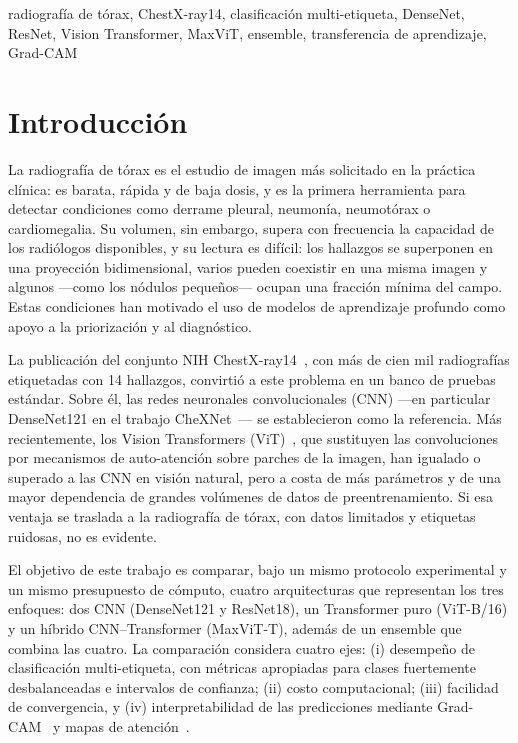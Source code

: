 \documentclass[conference]{IEEEtran}
\begin{document}
\begin{IEEEkeywords}
radiografía de tórax, ChestX-ray14, clasificación multi-etiqueta, DenseNet, ResNet, Vision Transformer, MaxViT, ensemble, transferencia de aprendizaje, Grad-CAM
\end{IEEEkeywords}

\section{Introducción}

La radiografía de tórax es el estudio de imagen más solicitado en la práctica clínica: es barata, rápida y de baja dosis, y es la primera herramienta para detectar condiciones como derrame pleural, neumonía, neumotórax o cardiomegalia. Su volumen, sin embargo, supera con frecuencia la capacidad de los radiólogos disponibles, y su lectura es difícil: los hallazgos se superponen en una proyección bidimensional, varios pueden coexistir en una misma imagen y algunos ---como los nódulos pequeños--- ocupan una fracción mínima del campo. Estas condiciones han motivado el uso de modelos de aprendizaje profundo como apoyo a la priorización y al diagnóstico.

La publicación del conjunto NIH ChestX-ray14~\cite{wang2017chestxray}, con más de cien mil radiografías etiquetadas con 14 hallazgos, convirtió a este problema en un banco de pruebas estándar. Sobre él, las redes neuronales convolucionales (CNN) ---en particular DenseNet121 en el trabajo CheXNet~\cite{rajpurkar2017chexnet}--- se establecieron como la referencia. Más recientemente, los Vision Transformers (ViT)~\cite{dosovitskiy2021vit}, que sustituyen las convoluciones por mecanismos de auto-atención sobre parches de la imagen, han igualado o superado a las CNN en visión natural, pero a costa de más parámetros y de una mayor dependencia de grandes volúmenes de datos de preentrenamiento. Si esa ventaja se traslada a la radiografía de tórax, con datos limitados y etiquetas ruidosas, no es evidente.

El objetivo de este trabajo es comparar, bajo un mismo protocolo experimental y un mismo presupuesto de cómputo, cuatro arquitecturas que representan los tres enfoques: dos CNN (DenseNet121 y ResNet18), un Transformer puro (ViT-B/16) y un híbrido CNN--Transformer (MaxViT-T), además de un ensemble que combina las cuatro. La comparación considera cuatro ejes: (i) desempeño de clasificación multi-etiqueta, con métricas apropiadas para clases fuertemente desbalanceadas e intervalos de confianza; (ii) costo computacional; (iii) facilidad de convergencia, y (iv) interpretabilidad de las predicciones mediante Grad-CAM~\cite{selvaraju2017gradcam} y mapas de atención~\cite{abnar2020rollout}.
\end{document}
